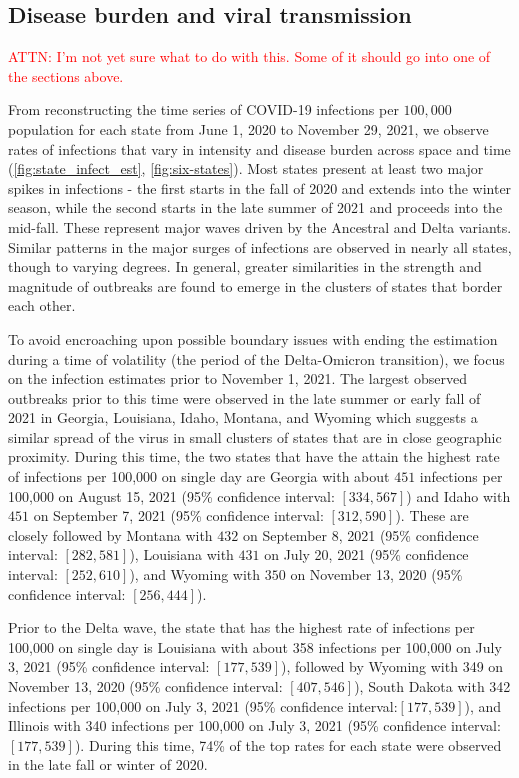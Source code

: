 \documentclass{article}
\newcommand{\attn }[1]{\textcolor{red}{ATTN: #1}}
\begin{document}
\subsection{Disease burden and viral transmission}

\attn{I'm not yet sure what to do with this. Some of it should go into one of 
the sections above.}

From reconstructing the time series of COVID-19 infections per $100,000$
population for each \US state from June 1, 2020 to November 29, 2021, we
observe rates of infections that vary in intensity and disease burden across
space and time (\autoref{fig:state_infect_est}, \autoref{fig:six-states}).  
Most states present at least two major spikes in infections - the first starts
in the fall of 2020 and extends into the winter season, while the second starts
in the late summer of 2021 and proceeds into the mid-fall. These represent major
waves driven by the Ancestral and Delta variants. Similar patterns in the major
surges of infections are observed in nearly all states, though to varying
degrees. In general, greater similarities in the strength and magnitude of
outbreaks are found to emerge in the clusters of states that border each other.

To avoid encroaching upon possible boundary issues with ending the estimation
during a time of volatility (the period of the Delta-Omicron transition), we
focus on the infection estimates prior to November 1, 2021. The largest observed
outbreaks prior to this time were observed in the late summer or early fall of
2021 in Georgia, Louisiana, Idaho, Montana, and Wyoming which suggests a similar
spread of the virus in small clusters of states that are in close geographic
proximity. During this time, the two states that have the attain the highest
rate of infections per 100,000 on single day are Georgia with about $451$
infections per 100,000 on August 15, 2021 (95\% confidence interval: $[334,
567]$) and Idaho with $451$ on September 7, 2021 (95\% confidence interval:
$[312, 590]$). These are closely followed by Montana with $432$ on September 8,
2021 (95\% confidence interval: $[282, 581]$), Louisiana with $431$ on July 20,
2021 (95\% confidence interval: $[252, 610]$), and Wyoming with $350$ on
November 13, 2020 (95\% confidence interval: $[256, 444]$).

Prior to the Delta wave, the state that has the highest rate of infections per
100,000 on single day is Louisiana with about 358 infections per 100,000 on July
3, 2021 (95\% confidence interval: $[177, 539]$), followed by Wyoming with 349
on November 13, 2020 (95\% confidence interval: $[407, 546]$), South Dakota with
342 infections per 100,000 on July 3, 2021 (95\% confidence interval:$[177,
539]$), and Illinois with 340 infections per 100,000 on July 3, 2021 (95\%
confidence interval: $[177, 539]$). During this time, 74\% of the top rates for
each state were observed in the late fall or winter of 2020.
\end{document}
